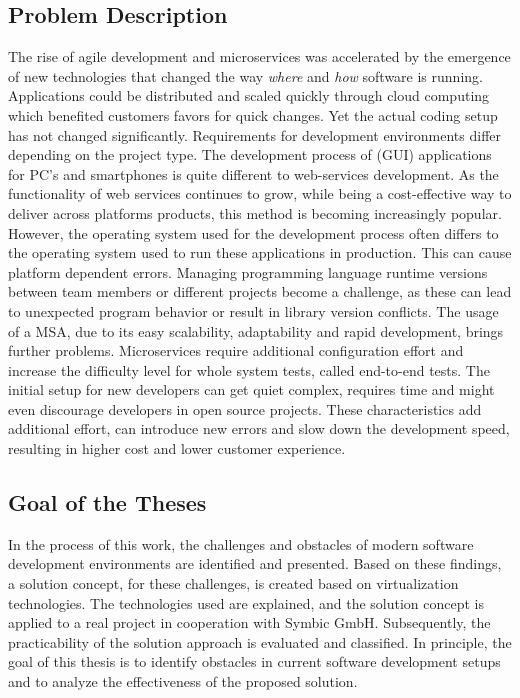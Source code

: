 \documentclass[12pt, a4paper]{article}
\begin{document}
    \subsection{Problem Description}
    The rise of agile development and microservices was accelerated by the emergence of new technologies that changed the way \textit{where} and \textit{how} software is running. Applications could be distributed and scaled quickly through cloud computing which benefited customers favors for quick changes. Yet the actual coding setup has not changed significantly.\newline
    Requirements for development environments differ depending on the project type. The development process of (\ac{GUI}) applications for PC's and smartphones is quite different to web-services development. As the functionality of web services continues to grow, while being a cost-effective way to deliver across platforms products, this method is becoming increasingly popular. However, the operating system used for the development process often differs to the operating system used to run these applications in production. This can cause platform dependent errors. Managing programming language runtime versions between team members or different projects become a challenge, as these can lead to unexpected program behavior or result in library version conflicts. The usage of a \acl{MSA}, due to its easy scalability, adaptability and rapid development, brings further problems. Microservices require additional configuration effort and increase the difficulty level for whole system tests, called end-to-end tests. The initial setup for new developers can get quiet complex, requires time and might even discourage developers in open source projects.\newline
    These characteristics add additional effort, can introduce new errors and slow down the development speed, resulting in higher cost and lower customer experience.

    \subsection{Goal of the Theses}
    In the process of this work, the challenges and obstacles of modern software development environments are identified and presented. Based on these findings, a solution concept, for these challenges, is created based on virtualization technologies. The technologies used are explained, and the solution concept is applied to a real project in cooperation with Symbic GmbH. Subsequently, the practicability of the solution approach is evaluated and classified. In principle, the goal of this thesis is to identify obstacles in current software development setups and to analyze the effectiveness of the proposed solution.
\end{document}
